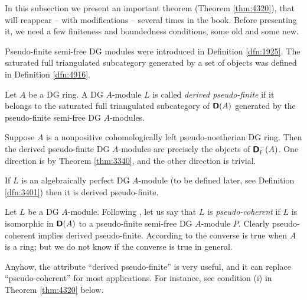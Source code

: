 \label{subsec:der-tens-eval}

In this subsection we pre\-sent an important theorem (Theorem 
\ref{thm:4320}), that will reappear -- with modifications -- several times in 
the book. Before presenting it, we need a few finiteness and boundedness 
conditions, some old and some new. 

Pseudo-finite semi-free DG modules were introduced in Definition 
\ref{dfn:1925}. The saturated full triangulated subcategory generated by a set 
of objects was defined in Definition \ref{dfn:4916}. 

\begin{dfn} \label{dfn:4470}
Let $A$ be a DG ring. A DG $A$-module $L$ is called 
{\em derived pseudo-finite}%
if it belongs to the saturated full triangulated subcategory of $\boldsymbol{\mathsf{D}}(A)$ 
generated by the pseudo-finite semi-free DG $A$-modules. 
\end{dfn}

\begin{exa} \label{exa:4471}
Suppose $A$ is a nonpositive cohomologically left pseudo-noe\-ther\-ian DG 
ring. Then the derived pseudo-finite DG $A$-modules are precisely the 
objects of $\boldsymbol{\mathsf{D}}_{\mathrm{f}}^{-}(A)$. One direction is by 
Theorem \ref{thm:3340}, and the other direction is trivial.  
\end{exa}

\begin{exa} \label{exa:4470}
If $L$ is an algebraically perfect DG $A$-module (to be defined later, 
see Definition \ref{dfn:3401}) then it is derived pseudo-finite.
\end{exa}

\begin{rem} \label{rem:4470}
Let $L$ be a DG $A$-module. Following \cite{SGA6}, let us say that 
$L$ is {\em pseudo-coherent}%
%
if $L$ is isomorphic in $\boldsymbol{\mathsf{D}}(A)$ to a 
pseudo-finite semi-free DG $A$-module $P$.
Clearly pseudo-coherent implies derived pseudo-finite. According to 
\cite[Lemma tag=064X]{SP} the converse is true when $A$ is a ring; but we do 
not know if the converse is true in general. 

Anyhow, the attribute ``derived pseudo-finite'' is very useful, 
and it can replace ``pseudo-coherent'' for most applications. For instance, 
see  condition (i) in Theorem \ref{thm:4320} below. 
\end{rem}

